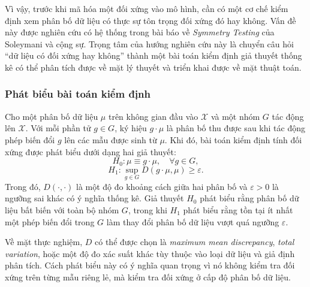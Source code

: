 Vì vậy, trước khi mã hóa một đối xứng vào mô hình, cần có một cơ chế kiểm định xem phân bố dữ liệu có thực sự tôn trọng đối xứng đó hay không. Vấn đề này được nghiên cứu có hệ thống trong bài báo về \textit{Symmetry Testing} của Soleymani và cộng sự. Trọng tâm của hướng nghiên cứu này là chuyển câu hỏi ``dữ liệu có đối xứng hay không'' thành một bài toán kiểm định giả thuyết thống kê có thể phân tích được về mặt lý thuyết và triển khai được về mặt thuật toán.

\subsubsection{Phát biểu bài toán kiểm định}

Cho một phân bố dữ liệu $\mu$ trên không gian đầu vào $\mathcal{X}$ và một nhóm $G$ tác động lên $\mathcal{X}$. Với mỗi phần tử $g \in G$, ký hiệu $g \cdot \mu$ là phân bố thu được sau khi tác động phép biến đổi $g$ lên các mẫu được sinh từ $\mu$. Khi đó, bài toán kiểm định tính đối xứng được phát biểu dưới dạng hai giả thuyết:
\begin{equation}
    H_0: \mu \equiv g \cdot \mu, \quad \forall g \in G,
    \label{eq:symmetry-testing-null}
\end{equation}
\begin{equation}
    H_1: \sup_{g \in G} D(g \cdot \mu, \mu) \geq \varepsilon.
    \label{eq:symmetry-testing-alternative}
\end{equation}
Trong đó, $D(\cdot,\cdot)$ là một độ đo khoảng cách giữa hai phân bố và $\varepsilon > 0$ là ngưỡng sai khác có ý nghĩa thống kê. Giả thuyết $H_0$ phát biểu rằng phân bố dữ liệu bất biến với toàn bộ nhóm $G$, trong khi $H_1$ phát biểu rằng tồn tại ít nhất một phép biến đổi trong $G$ làm thay đổi phân bố dữ liệu vượt quá ngưỡng $\varepsilon$.

Về mặt thực nghiệm, $D$ có thể được chọn là \textit{maximum mean discrepancy}, \textit{total variation}, hoặc một độ đo xác suất khác tùy thuộc vào loại dữ liệu và giả định phân tích. Cách phát biểu này có ý nghĩa quan trọng vì nó không kiểm tra đối xứng trên từng mẫu riêng lẻ, mà kiểm tra đối xứng ở cấp độ phân bố dữ liệu.

